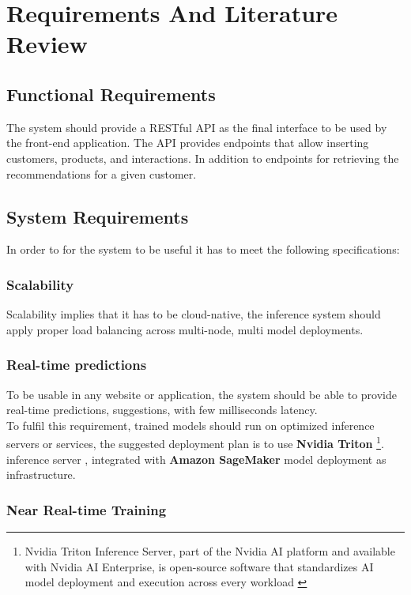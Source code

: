 \chapter{Requirements And Literature Review}
\minitoc

\section{Functional Requirements}

The system should provide a RESTful API as the final interface to be used by the front-end application.
The API provides endpoints that allow inserting customers, products, and interactions. In addition to endpoints for retrieving the recommendations for a given customer.

\section{System Requirements}

In order to for the system to be useful it has to meet the following specifications:

\subsection{Scalability}
Scalability implies that it has to be cloud-native, the inference system should apply proper load balancing across multi-node, multi model deployments.

\subsection{Real-time predictions}
To be usable in any website or application, the system should be able to provide real-time predictions, suggestions, with few milliseconds latency. \\

To fulfil this requirement, trained models should run on optimized inference servers or services, the suggested deployment plan is to use
\textbf{Nvidia Triton}
\footnote{Nvidia Triton Inference Server, part of the Nvidia AI platform and available with Nvidia AI Enterprise, is open-source software that standardizes AI model deployment and execution across every workload \cite{Triton}}. 
inference server \cite{Triton}, 
integrated with \textbf{Amazon SageMaker} model deployment \cite{SageMaker} as infrastructure.

\subsection{Near Real-time Training}


